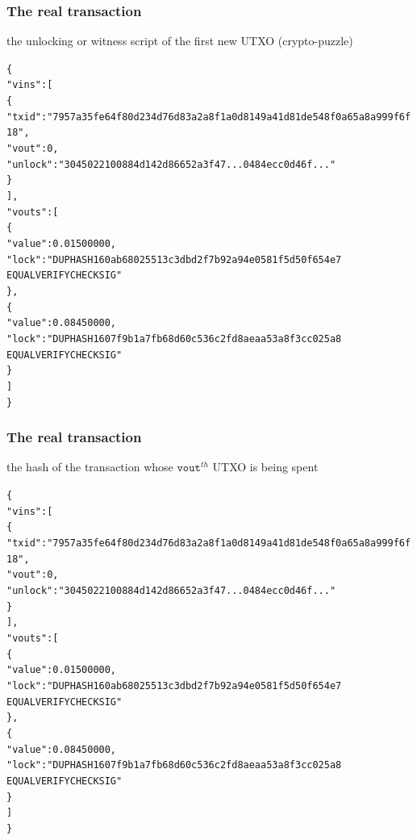 \documentclass[11pt]{beamer}  %
\begin{document}
\begin{frame}[fragile]\frametitle{The real transaction}

  \begin{center}
    the unlocking or witness script of the first new UTXO (crypto-puzzle)
  \end{center}

  {\scriptsize\begin{alltt}
\{
  "vins": [
    \{
      "txid": "7957a35fe64f80d234d76d83a2a8f1a0d8149a41d81de548f0a65a8a999f6f18",
      "vout": 0,
      "unlock": "3045022100884d142d86652a3f47... 0484ecc0d46f..."
    \}
  ],
  "vouts": [
    \{
      "value": 0.01500000,
      \alert{"lock": "DUP HASH160 ab68025513c3dbd2f7b92a94e0581f5d50f654e7
               EQUALVERIFY CHECKSIG"}
    \},
    \{
      "value": 0.08450000,
      "lock": "DUP HASH160 7f9b1a7fb68d60c536c2fd8aeaa53a8f3cc025a8
               EQUALVERIFY CHECKSIG"
    \}
  ]
\}
\end{alltt}}

\end{frame}

\begin{frame}[fragile]\frametitle{The real transaction}

  \begin{center}
    the hash of the transaction whose $\mathtt{vout}^{\mathit{th}}$ UTXO is being spent
  \end{center}

  {\scriptsize\begin{alltt}
\{
  "vins": [
    \{
      \alert{"txid": "7957a35fe64f80d234d76d83a2a8f1a0d8149a41d81de548f0a65a8a999f6f18",
      "vout": 0},
      "unlock": "3045022100884d142d86652a3f47... 0484ecc0d46f..."
    \}
  ],
  "vouts": [
    \{
      "value": 0.01500000,
      "lock": "DUP HASH160 ab68025513c3dbd2f7b92a94e0581f5d50f654e7
               EQUALVERIFY CHECKSIG"
    \},
    \{
      "value": 0.08450000,
      "lock": "DUP HASH160 7f9b1a7fb68d60c536c2fd8aeaa53a8f3cc025a8
               EQUALVERIFY CHECKSIG"
    \}
  ]
\}
\end{alltt}}

\end{frame}
\end{document}
